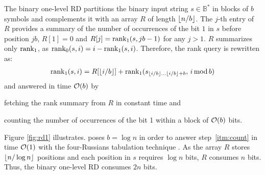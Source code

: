 The binary one-level RD partitions the binary input string $s \in \mathbb{B}^*$ in blocks of $b$ symbols and
complements it with an array $R$ of length $\left \lfloor n/b \right \rfloor$.
The $j$-th entry of $R$ provides a summary of the number of occurrences of the bit $1$ in $s$ before position $j b$, \ie $R[1] = 0$ and $R[j] = \text{rank}_1(s, j b - 1)$ for any $j > 1$.
$R$ summarizes only $\text{rank}_1$, as $\text{rank}_0(s, i) = i - \text{rank}_1(s, i)$.
Therefore, the rank query is rewritten as:
\begin{eqnarray}
\rank_1(s,i) = R[\xfloor{i/b}] + \rank_1(s_{\xfloor{i/b} \dots \xfloor{i/b}+b}, \, i \imod{b})
\end{eqnarray}
and answered in time $\mathcal{O}(b)$ by 
\begin{inparaenum}[(i)]
\item \label{itm:fetch} fetching the rank summary from $R$ in constant time and
\item \label{itm:count} counting the number of occurrences of the bit 1 within a block of $\mathcal{O}(b)$ bits.
\end{inparaenum}
Figure \ref{fig:rd1} illustrates.
\citeauthor{Jacobson1989} poses $b=\log{n}$ in order to answer step~\ref{itm:count} in time $\mathcal{O}(1)$ with the four-Russians tabulation technique \citep{Arlazarov1975}.
As the array $R$ stores $\left \lfloor n/\log{n} \right \rfloor$ positions and each position in $s$ requires $\log{n}$ bits, $R$ consumes $n$ bits.
Thus, the binary one-level RD consumes $2n$ bits.

